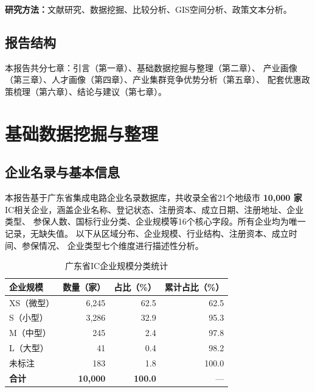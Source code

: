 \documentclass[12pt,a4paper]{ctexart}
\newcommand{\tableHeaderRow}{\rowcolor{tealPrimary}\color{white}}
\newcommand{\tableOddRow}{\rowcolor{mintBG}}
\newcommand{\tableEvenRow}{\rowcolor{white}}
\begin{document}
\textbf{研究方法：}文献研究、数据挖掘、比较分析、GIS空间分析、政策文本分析。

\subsection{报告结构}
\label{sec:structure}

本报告共分七章：引言（第一章）、基础数据挖掘与整理（第二章）、
产业画像（第三章）、人才画像（第四章）、产业集群竞争优势分析（第五章）、
配套优惠政策梳理（第六章）、结论与建议（第七章）。

\section{基础数据挖掘与整理}
\label{sec:data}

\subsection{企业名录与基本信息}
\label{sec:enterprises}

本报告基于广东省集成电路企业名录数据库，共收录全省21个地级市 \textbf{10,000 家}
IC相关企业，涵盖企业名称、登记状态、注册资本、成立日期、注册地址、企业类型、
参保人数、国标行业分类、企业规模等16个核心字段。所有企业均为唯一记录，无缺失值。
以下从区域分布、企业规模、行业结构、注册资本、成立时间、参保情况、
企业类型七个维度进行描述性分析。

\begin{table}[H]
\centering
\caption{广东省IC企业规模分类统计}
\label{tab:scale}
\begin{tabular}{lrrr}
\toprule
\tableHeaderRow
\textbf{企业规模} & \textbf{数量（家）} & \textbf{占比（\%）} & \textbf{累计占比（\%）} \\
\midrule
\tableOddRow  XS（微型）  & 6,245 & 62.5 & 62.5 \\
\tableEvenRow S（小型）   & 3,286 & 32.9 & 95.3 \\
\tableOddRow  M（中型）   & 245   & 2.4  & 97.8 \\
\tableEvenRow L（大型）   & 41    & 0.4  & 98.2 \\
\tableOddRow  未标注      & 183   & 1.8  & 100.0 \\
\midrule
\tableEvenRow \textbf{合计} & \textbf{10,000} & \textbf{100.0} & — \\
\bottomrule
\end{tabular}
\end{table}
\end{document}

